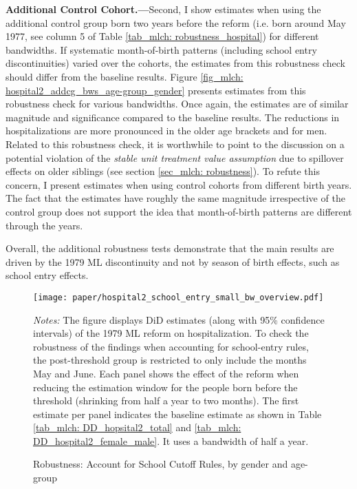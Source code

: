 \textbf{Additional Control Cohort.---}Second, I show estimates when using the additional control group born two years before the reform (i.e. born around May 1977, see column 5 of Table \ref{tab_mlch: robustness_hospital}) for different bandwidths. If systematic month-of-birth patterns (including school entry discontinuities) varied over the cohorts, the estimates from this robustness check should differ from the baseline results. Figure \ref{fig_mlch: hospital2_addcg_bws_age-group_gender} presents estimates from this robustness check for various bandwidths. Once again, the estimates are of similar magnitude and significance compared to the baseline results. The reductions in hospitalizations are more pronounced in the older age brackets and for men. Related to this robustness check, it is worthwhile to point to the discussion on a potential violation of the \textit{stable unit treatment value assumption} due to spillover effects on older siblings (see section \ref{sec_mlch: robustness}). To refute this concern, I present estimates when using control cohorts from different birth years. The fact that the estimates have roughly the same magnitude irrespective of the control group does not support the idea that month-of-birth patterns are different through the years.

Overall, the additional robustness tests demonstrate that the main results are driven by the 1979 ML discontinuity and not by season of birth effects, such as school entry effects.




 




\begin{landscape}
	\vspace*{\fill}
	\begin{figure}[H]\centering
		\texttt{[image: paper/hospital2\_school\_entry\_small\_bw\_overview.pdf]}
		\scriptsize
		\begin{minipage}{0.95\linewidth}
			\caption{Robustness: Account for School Cutoff Rules, by gender and age-group}\label{fig_mlch: hospital2_school_cutoff}
			\emph{Notes:} The figure displays DiD estimates (along with 95\% confidence intervals) of the 1979 ML reform on hospitalization. To check the robustness of the findings when accounting for school-entry rules, the post-threshold group is restricted to only include the months May and June. Each panel shows the effect of the reform when reducing the estimation window for the people born before the threshold (shrinking from half a year to two months). The first estimate per panel indicates the baseline estimate as shown in Table \ref{tab_mlch: DD_hopsital2_total} and \ref{tab_mlch: DD_hospital2_female_male}. It uses a bandwidth of half a year.
		\end{minipage}
	\end{figure}
	\vspace*{\fill}\clearpage
\end{landscape}




